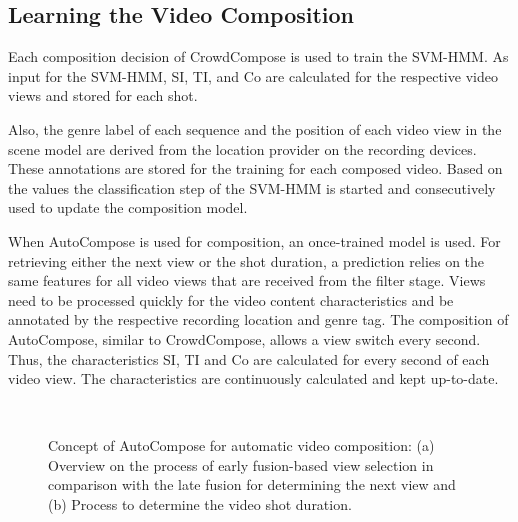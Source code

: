 \subsection{Learning the Video Composition}
Each composition decision of CrowdCompose is used to train the \ac{SVM-HMM}.
As input for the \ac{SVM-HMM}, \ac{SI}, \ac{TI}, and \ac{Co} are calculated for the respective video views and stored for each shot.

Also, the genre label of each sequence and the position of each video view in the scene model are derived from the location provider on the recording devices.
These annotations are stored for the training for each composed video.
Based on the values the classification step of the \ac{SVM-HMM} is started and consecutively used to update the composition model.

When AutoCompose is used for composition, an once-trained model is used.
For retrieving either the next view or the shot duration, a prediction relies on the same features for all video views that are received from the filter stage.
Views need to be processed quickly for the video content characteristics and be annotated by the respective recording location and genre tag.
The composition of AutoCompose, similar to CrowdCompose, allows a view switch every second.
Thus, the characteristics \ac{SI}, \ac{TI} and \ac{Co} are calculated for every second of each video view.
The characteristics are continuously calculated and kept up-to-date.
\begin{figure}
	\centering
	\\
	\caption[Concept of AutoCompose]{Concept of AutoCompose for automatic video composition: (a) Overview on the process of early fusion-based view selection in comparison with the late fusion for determining the next view and (b) Process to determine the video shot duration.}
	\label{fig:630_viewSelection}
\end{figure}

